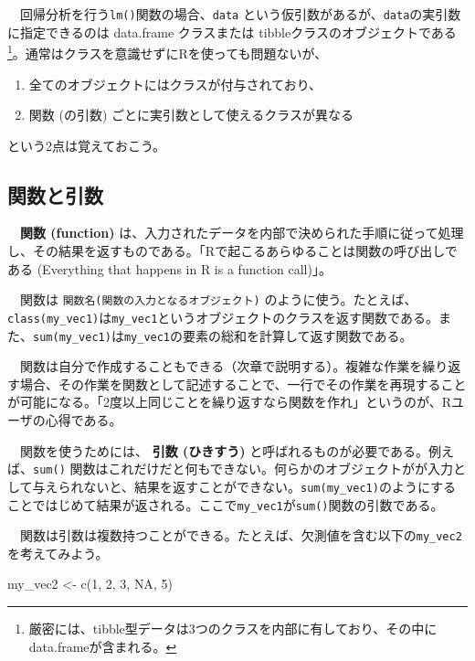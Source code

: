 \documentclass[
  a4paper,
  pandoc,
  ja=standard,
  jafont=haranoaji]{bxjsbook}
\newenvironment{Shaded}{\begin{snugshade}}{\end{snugshade}}
\newcommand{\ConstantTok}[1]{\textcolor[rgb]{0.56,0.35,0.01}{#1}}
\newcommand{\DecValTok}[1]{\textcolor[rgb]{0.68,0.00,0.00}{#1}}
\newcommand{\FunctionTok}[1]{\textcolor[rgb]{0.28,0.35,0.67}{#1}}
\newcommand{\NormalTok}[1]{\textcolor[rgb]{0.00,0.48,0.65}{#1}}
\newcommand{\OtherTok}[1]{\textcolor[rgb]{0.00,0.48,0.65}{#1}}
\providecommand{\tightlist}{%
  \setlength{\itemsep}{0pt}\setlength{\parskip}{0pt}}
\begin{document}
　回帰分析を行う\texttt{lm()}関数の場合、\texttt{data}
という仮引数があるが、\texttt{data}の実引数に指定できるのは data.frame
クラスまたは
tibbleクラスのオブジェクトである\footnote{厳密には、tibble型データは3つのクラスを内部に有しており、その中にdata.frameが含まれる。}。通常はクラスを意識せずにRを使っても問題ないが、

\begin{enumerate}
\def\labelenumi{\arabic{enumi}.}
\tightlist
\item
  全てのオブジェクトにはクラスが付与されており、
\item
  関数 (の引数) ごとに実引数として使えるクラスが異なる
\end{enumerate}

という2点は覚えておこう。

\hypertarget{ux95a2ux6570ux3068ux5f15ux6570}{%
\subsection{関数と引数}\label{ux95a2ux6570ux3068ux5f15ux6570}}

　\textbf{関数 (function)}
は、入力されたデータを内部で決められた手順に従って処理し、その結果を返すものである。「Rで起こるあらゆることは関数の呼び出しである
(Everything that happens in R is a function
call)」\citep{Chambers:2016}。

　関数は \texttt{関数名(関数の入力となるオブジェクト)}
のように使う。たとえば、\texttt{class(my\_vec1)}は\texttt{my\_vec1}というオブジェクトのクラスを返す関数である。また、\texttt{sum(my\_vec1)}は\texttt{my\_vec1}の要素の総和を計算して返す関数である。

　関数は自分で作成することもできる（次章で説明する）。複雑な作業を繰り返す場合、その作業を関数として記述することで、一行でその作業を再現することが可能になる。「2度以上同じことを繰り返すなら関数を作れ」というのが、Rユーザの心得である。

　関数を使うためには、 \textbf{引数 (ひきすう)}
と呼ばれるものが必要である。例えば、\texttt{sum()}
関数はこれだけだと何もできない。何らかのオブジェクトがが入力として与えられないと、結果を返すことができない。\texttt{sum(my\_vec1)}のようにすることではじめて結果が返される。ここで\texttt{my\_vec1}が\texttt{sum()}関数の引数である。

　関数は引数は複数持つことができる。たとえば、欠測値を含む以下の\texttt{my\_vec2}を考えてみよう。

\begin{Shaded}
\begin{Highlighting}[numbers=left,,]
\NormalTok{my\_vec2 }\OtherTok{\textless{}{-}} \FunctionTok{c}\NormalTok{(}\DecValTok{1}\NormalTok{, }\DecValTok{2}\NormalTok{, }\DecValTok{3}\NormalTok{, }\ConstantTok{NA}\NormalTok{, }\DecValTok{5}\NormalTok{)}
\end{Highlighting}
\end{Shaded}
\end{document}
